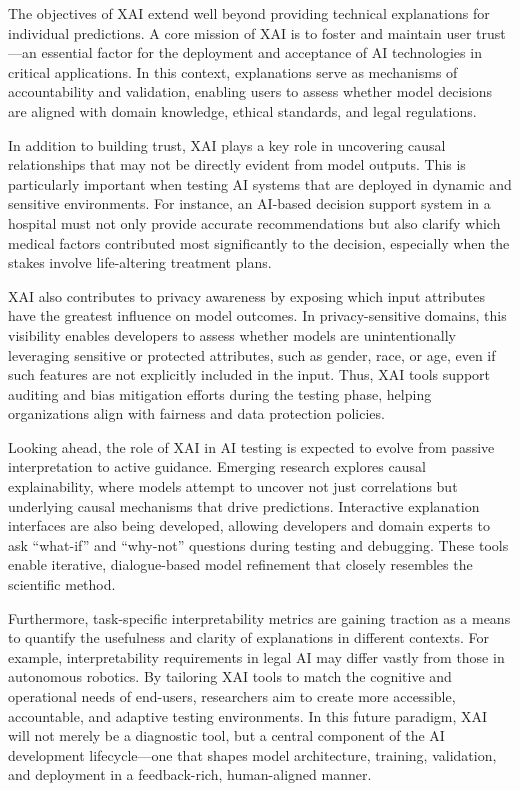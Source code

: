 \documentclass[manuscript,screen,review]{acmart}
\begin{document}
The objectives of XAI extend well beyond providing technical explanations for individual predictions. A core mission of XAI is to foster and maintain user trust—an essential factor for the deployment and acceptance of AI technologies in critical applications. In this context, explanations serve as mechanisms of accountability and validation, enabling users to assess whether model decisions are aligned with domain knowledge, ethical standards, and legal regulations.

In addition to building trust, XAI plays a key role in uncovering causal relationships that may not be directly evident from model outputs. This is particularly important when testing AI systems that are deployed in dynamic and sensitive environments. For instance, an AI-based decision support system in a hospital must not only provide accurate recommendations but also clarify which medical factors contributed most significantly to the decision, especially when the stakes involve life-altering treatment plans.

XAI also contributes to privacy awareness by exposing which input attributes have the greatest influence on model outcomes. In privacy-sensitive domains, this visibility enables developers to assess whether models are unintentionally leveraging sensitive or protected attributes, such as gender, race, or age, even if such features are not explicitly included in the input. Thus, XAI tools support auditing and bias mitigation efforts during the testing phase, helping organizations align with fairness and data protection policies.

Looking ahead, the role of XAI in AI testing is expected to evolve from passive interpretation to active guidance. Emerging research explores causal explainability, where models attempt to uncover not just correlations but underlying causal mechanisms that drive predictions. Interactive explanation interfaces are also being developed, allowing developers and domain experts to ask “what-if” and “why-not” questions during testing and debugging. These tools enable iterative, dialogue-based model refinement that closely resembles the scientific method.

Furthermore, task-specific interpretability metrics are gaining traction as a means to quantify the usefulness and clarity of explanations in different contexts. For example, interpretability requirements in legal AI may differ vastly from those in autonomous robotics. By tailoring XAI tools to match the cognitive and operational needs of end-users, researchers aim to create more accessible, accountable, and adaptive testing environments. In this future paradigm, XAI will not merely be a diagnostic tool, but a central component of the AI development lifecycle---one that shapes model architecture, training, validation, and deployment in a feedback-rich, human-aligned manner.
\end{document}
